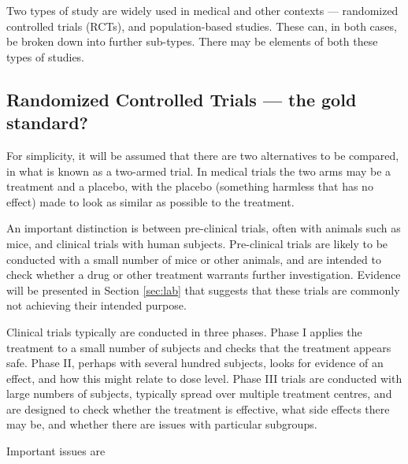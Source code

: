 \documentclass[
  10pt,
  b5paper]{book}
\begin{document}
Two types of study are widely used in medical and other contexts ---
randomized controlled trials (RCTs), and population-based studies. These
can, in both cases, be broken down into further sub-types. There may be
elements of both these types of studies.

\hypertarget{randomized-controlled-trials-the-gold-standard}{%
\subsection*{Randomized Controlled Trials --- the gold standard?}\label{randomized-controlled-trials-the-gold-standard}}

For simplicity, it will be assumed that there are two alternatives to be
compared, in what is known as a two-armed trial. In medical trials the
two arms may be a treatment and a placebo, with the placebo (something
harmless that has no effect) made to look as similar as possible to the
treatment.

An important distinction is between pre-clinical trials, often with
animals such as mice, and clinical trials with human subjects.
Pre-clinical trials are likely to be conducted with a small number of
mice or other animals, and are intended to check whether a drug or other
treatment warrants further investigation. Evidence will be presented in
Section \ref{sec:lab} that suggests that these trials are commonly not
achieving their intended purpose.

Clinical trials typically are conducted in three phases. Phase I applies
the treatment to a small number of subjects and checks that the
treatment appears safe. Phase II, perhaps with several hundred subjects,
looks for evidence of an effect, and how this might relate to dose
level. Phase III trials are conducted with large numbers of subjects,
typically spread over multiple treatment centres, and are designed to
check whether the treatment is effective, what side effects there may
be, and whether there are issues with particular subgroups.

Important issues are
\end{document}
